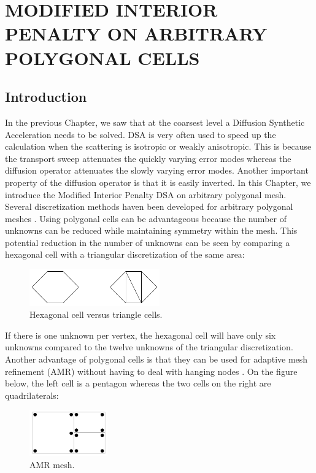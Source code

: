 \chapter{\uppercase{Modified Interior Penalty on Arbitrary Polygonal Cells}}
\section{Introduction}
In the previous Chapter, we saw that at the coarsest level a Diffusion
Synthetic Acceleration needs to be solved. DSA is very often used to speed up the
calculation when the scattering is isotropic or weakly anisotropic. This is
because the transport sweep attenuates the quickly varying error modes whereas
the diffusion operator attenuates the slowly varying error modes.  Another
important property of the diffusion operator is that it is easily inverted. 
In this Chapter, we introduce the Modified Interior Penalty DSA on arbitrary 
polygonal mesh. Several discretization methods haven been developed for 
arbitrary polygonal meshes \cite{pwld_2d,pwld_3d,pwl_diffusion,palmer_ane,
palmer_proc,palmer_fe,wachspress,cell_centered_diff,mimetic}. Using polygonal 
cells can be advantageous because the number of unknowns can be reduced while 
maintaining symmetry within the mesh. This potential reduction in the number of 
unknowns can be seen by comparing a hexagonal cell with a triangular 
discretization of the same area:
\begin{figure}[H]
\centering
\includegraphics[width=0.5\textwidth]{./Dsa/hex_tri_cells}
\caption{Hexagonal cell versus triangle cells.}
\end{figure}
If there is one unknown per vertex, the hexagonal cell will have only six
unknowns compared to the twelve unknowns of the triangular discretization. Another 
advantage of polygonal cells is that they can be used for adaptive mesh 
refinement (AMR) \cite{amr_rad,amr_block,amr_unstruc} without having to
deal with hanging nodes \cite{arbitrary_hanging_nodes,dealII_hanging_nodes,
locally_hanging_nodes}. On the figure below, the left cell is a pentagon 
whereas the two cells on the right are quadrilaterals:
\begin{figure}[H]
\centering
\includegraphics[width=0.3\textwidth]{./Dsa/amr}
\caption{AMR mesh.}
\end{figure}
